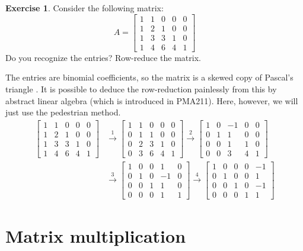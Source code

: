 \documentclass[a4paper]{book}
\newcommand{\bbm}       {\begin{bmatrix}}
\newcommand{\ebm}       {\end{bmatrix}}
\newcommand{\xra}       {\xrightarrow}
\renewcommand{\:}{\colon}
\newcommand{\mathworld}[1]{}
\newcommand{\PMA}[1]{PMA#1}
\theoremstyle{definition}
\newtheorem{exercise}[theorem]{Exercise}
\renewenvironment{solution}{\SolutionInline}{\endSolutionInline}
\begin{document}
\begin{exercise}
 Consider the following matrix:
 \[ A = \bbm
          1 & 1 & 0 & 0 & 0 \\
          1 & 2 & 1 & 0 & 0 \\
          1 & 3 & 3 & 1 & 0 \\
          1 & 4 & 6 & 4 & 1
        \ebm
 \]
 Do you recognize the entries?  Row-reduce the matrix.
\end{exercise}
\begin{solution}
 The entries are binomial coefficients, so the matrix is a skewed copy
 of Pascal's triangle \mathworld{PascalsTriangle}.  It is possible to
 deduce the row-reduction painlessly from this by abstract linear
 algebra (which is introduced in \PMA{211}).  Here, however, we will
 just use the pedestrian method.
 \begin{align*}
  \bbm 1&1&0&0&0 \\ 1&2&1&0&0 \\ 1&3&3&1&0 \\ 1&4&6&4&1 \ebm
   & \xra{1}
  \bbm 1&1&0&0&0 \\ 0&1&1&0&0 \\ 0&2&3&1&0 \\ 0&3&6&4&1 \ebm
     \xra{2}
  \bbm 1&0&-1&0&0 \\ 0&1&1&0&0 \\ 0&0&1&1&0 \\ 0&0&3&4&1 \ebm \\
   & \xra{3}
  \bbm 1&0&0&1&0 \\ 0&1&0&-1&0 \\ 0&0&1&1&0 \\ 0&0&0&1&1 \ebm
     \xra{4}
  \bbm 1&0&0&0&-1 \\ 0&1&0&0&1 \\ 0&0&1&0&-1 \\ 0&0&0&1&1 \ebm
 \end{align*}
\end{solution}


\section{Matrix multiplication}
\label{sec-mat-mult}
\end{document}
